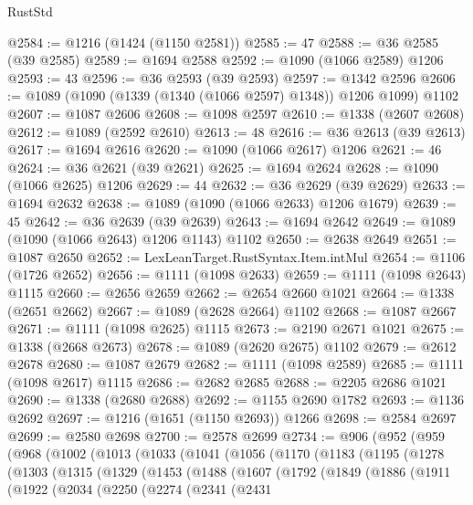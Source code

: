 \begin{lexlean}{RustStd}
\begin{coremodule}
{\begin{coremodule}
{{{{{{{{{{{{{{{{{{{{{{{{{{@2584 := @1216 (@1424 (@1150 @2581))
@2585 := 47
@2588 := @36 @2585 (@39 @2585)
@2589 := @1694 @2588
@2592 := @1090 (@1066 @2589) @1206
@2593 := 43
@2596 := @36 @2593 (@39 @2593)
@2597 := @1342 @2596
@2606 := @1089 (@1090 (@1339 (@1340 (@1066 @2597) @1348)) @1206 @1099) @1102
@2607 := @1087 @2606
@2608 := @1098 @2597
@2610 := @1338 (@2607 @2608)
@2612 := @1089 (@2592 @2610)
@2613 := 48
@2616 := @36 @2613 (@39 @2613)
@2617 := @1694 @2616
@2620 := @1090 (@1066 @2617) @1206
@2621 := 46
@2624 := @36 @2621 (@39 @2621)
@2625 := @1694 @2624
@2628 := @1090 (@1066 @2625) @1206
@2629 := 44
@2632 := @36 @2629 (@39 @2629)
@2633 := @1694 @2632
@2638 := @1089 (@1090 (@1066 @2633) @1206 @1679)
@2639 := 45
@2642 := @36 @2639 (@39 @2639)
@2643 := @1694 @2642
@2649 := @1089 (@1090 (@1066 @2643) @1206 @1143) @1102
@2650 := @2638 @2649
@2651 := @1087 @2650
@2652 := LexLeanTarget.RustSyntax.Item.intMul
@2654 := @1106 (@1726 @2652)
@2656 := @1111 (@1098 @2633)
@2659 := @1111 (@1098 @2643) @1115
@2660 := @2656 @2659
@2662 := @2654 @2660 @1021
@2664 := @1338 (@2651 @2662)
@2667 := @1089 (@2628 @2664) @1102
@2668 := @1087 @2667
@2671 := @1111 (@1098 @2625) @1115
@2673 := @2190 @2671 @1021
@2675 := @1338 (@2668 @2673)
@2678 := @1089 (@2620 @2675) @1102
@2679 := @2612 @2678
@2680 := @1087 @2679
@2682 := @1111 (@1098 @2589)
@2685 := @1111 (@1098 @2617) @1115
@2686 := @2682 @2685
@2688 := @2205 @2686 @1021
@2690 := @1338 (@2680 @2688)
@2692 := @1155 @2690 @1782
@2693 := @1136 @2692
@2697 := @1216 (@1651 (@1150 @2693)) @1266
@2698 := @2584 @2697
@2699 := @2580 @2698
@2700 := @2578 @2699
@2734 := @906
    (@952
      (@959
        (@968
          (@1002
            (@1013
              (@1033
                (@1041
                  (@1056
                    (@1170
                      (@1183
                        (@1195
                          (@1278
                            (@1303
                              (@1315
                                (@1329
                                  (@1453
                                    (@1488
                                      (@1607
                                        (@1792
                                          (@1849
                                            (@1886
                                              (@1911
                                                (@1922
                                                  (@2034
                                                    (@2250
                                                      (@2274
                                                        (@2341
                                                          (@2431
}}}}}}}}}}}}}}}}}}}}}}}}}}
\end{coremodule}}
\end{coremodule}
\end{lexlean}
